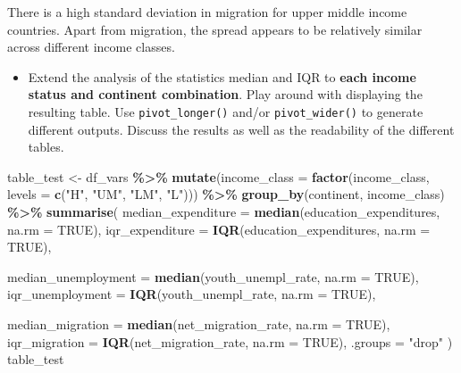 \documentclass[
]{article}
\newenvironment{Shaded}{\begin{snugshade}}{\end{snugshade}}
\newcommand{\AttributeTok}[1]{\textcolor[rgb]{0.13,0.29,0.53}{#1}}
\newcommand{\ConstantTok}[1]{\textcolor[rgb]{0.56,0.35,0.01}{#1}}
\newcommand{\FunctionTok}[1]{\textcolor[rgb]{0.13,0.29,0.53}{\textbf{#1}}}
\newcommand{\NormalTok}[1]{#1}
\newcommand{\OtherTok}[1]{\textcolor[rgb]{0.56,0.35,0.01}{#1}}
\newcommand{\SpecialCharTok}[1]{\textcolor[rgb]{0.81,0.36,0.00}{\textbf{#1}}}
\newcommand{\StringTok}[1]{\textcolor[rgb]{0.31,0.60,0.02}{#1}}
\providecommand{\tightlist}{%
  \setlength{\itemsep}{0pt}\setlength{\parskip}{0pt}}
\begin{document}
There is a high standard deviation in migration for upper middle income
countries. Apart from migration, the spread appears to be relatively
similar across different income classes.

\begin{itemize}
\tightlist
\item
  Extend the analysis of the statistics median and IQR to \textbf{each
  income status and continent combination}. Play around with displaying
  the resulting table. Use \texttt{pivot\_longer()} and/or
  \texttt{pivot\_wider()} to generate different outputs. Discuss the
  results as well as the readability of the different tables.
\end{itemize}

\begin{Shaded}
\begin{Highlighting}[]
\NormalTok{table\_test }\OtherTok{\textless{}{-}}\NormalTok{ df\_vars }\SpecialCharTok{\%\textgreater{}\%}
  \FunctionTok{mutate}\NormalTok{(}\AttributeTok{income\_class =} \FunctionTok{factor}\NormalTok{(income\_class, }\AttributeTok{levels =} \FunctionTok{c}\NormalTok{(}\StringTok{"H"}\NormalTok{, }\StringTok{"UM"}\NormalTok{, }\StringTok{"LM"}\NormalTok{, }\StringTok{"L"}\NormalTok{))) }\SpecialCharTok{\%\textgreater{}\%}
  \FunctionTok{group\_by}\NormalTok{(continent, income\_class) }\SpecialCharTok{\%\textgreater{}\%}
  \FunctionTok{summarise}\NormalTok{(}
    \AttributeTok{median\_expenditure =} \FunctionTok{median}\NormalTok{(education\_expenditures, }\AttributeTok{na.rm =} \ConstantTok{TRUE}\NormalTok{),}
    \AttributeTok{iqr\_expenditure =} \FunctionTok{IQR}\NormalTok{(education\_expenditures, }\AttributeTok{na.rm =} \ConstantTok{TRUE}\NormalTok{),}
    
    \AttributeTok{median\_unemployment =} \FunctionTok{median}\NormalTok{(youth\_unempl\_rate, }\AttributeTok{na.rm =} \ConstantTok{TRUE}\NormalTok{),}
    \AttributeTok{iqr\_unemployment =} \FunctionTok{IQR}\NormalTok{(youth\_unempl\_rate, }\AttributeTok{na.rm =} \ConstantTok{TRUE}\NormalTok{),}
    
    \AttributeTok{median\_migration =} \FunctionTok{median}\NormalTok{(net\_migration\_rate, }\AttributeTok{na.rm =} \ConstantTok{TRUE}\NormalTok{),}
    \AttributeTok{iqr\_migration =} \FunctionTok{IQR}\NormalTok{(net\_migration\_rate, }\AttributeTok{na.rm =} \ConstantTok{TRUE}\NormalTok{),}
    \AttributeTok{.groups =} \StringTok{"drop"}
\NormalTok{  )}
\NormalTok{table\_test}
\end{Highlighting}
\end{Shaded}
\end{document}
